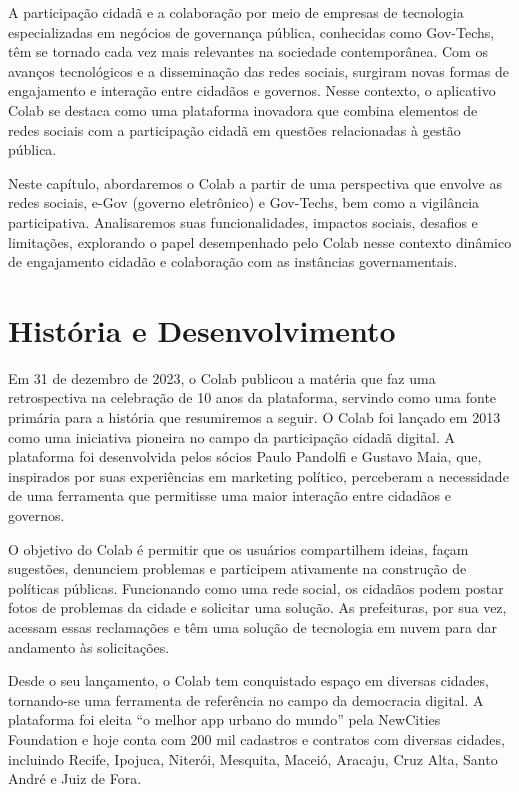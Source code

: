 A participação cidadã e a colaboração por meio de empresas de tecnologia especializadas em negócios de governança pública, conhecidas como Gov-Techs, têm se tornado cada vez mais relevantes na sociedade contemporânea. Com os avanços tecnológicos e a disseminação das redes sociais, surgiram novas formas de engajamento e interação entre cidadãos e governos. Nesse contexto, o aplicativo Colab se destaca como uma plataforma inovadora que combina elementos de redes sociais com a participação cidadã em questões relacionadas à gestão pública.

Neste capítulo, abordaremos o Colab a partir de uma perspectiva que envolve as redes sociais, e-Gov (governo eletrônico) e Gov-Techs, bem como a vigilância participativa. Analisaremos suas funcionalidades, impactos sociais, desafios e limitações, explorando o papel desempenhado pelo Colab nesse contexto dinâmico de engajamento cidadão e colaboração com as instâncias governamentais.

\section{História e Desenvolvimento}
Em 31 de dezembro de 2023, o Colab publicou a matéria \cite{2023_Colab_PAGE} que faz uma retrospectiva na celebração de 10 anos da plataforma, servindo como uma fonte primária para a história que resumiremos a seguir. O Colab foi lançado em 2013 como uma iniciativa pioneira no campo da participação cidadã digital. A plataforma foi desenvolvida pelos sócios Paulo Pandolfi e Gustavo Maia, que, inspirados por suas experiências em marketing político, perceberam a necessidade de uma ferramenta que permitisse uma maior interação entre cidadãos e governos.

O objetivo do Colab é permitir que os usuários compartilhem ideias, façam sugestões, denunciem problemas e participem ativamente na construção de políticas públicas. Funcionando como uma rede social, os cidadãos podem postar fotos de problemas da cidade e solicitar uma solução. As prefeituras, por sua vez, acessam essas reclamações e têm uma solução de tecnologia em nuvem para dar andamento às solicitações.

Desde o seu lançamento, o Colab tem conquistado espaço em diversas cidades, tornando-se uma ferramenta de referência no campo da democracia digital. A plataforma foi eleita “o melhor app urbano do mundo” pela NewCities Foundation e hoje conta com 200 mil cadastros e contratos com diversas cidades, incluindo Recife, Ipojuca, Niterói, Mesquita, Maceió, Aracaju, Cruz Alta, Santo André e Juiz de Fora.

